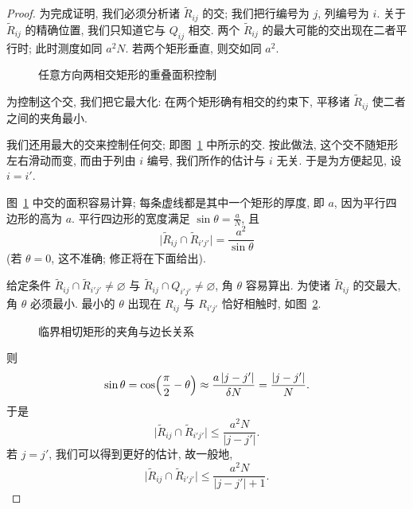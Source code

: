 \begin{proof}
为完成证明, 我们必须分析诸 $\tilde{R}_{ij}$ 的交; 我们把行编号为 $j$, 列编号为 $i$. 关于 $\tilde{R}_{ij}$ 的精确位置, 我们只知道它与 $Q_{ij}$ 相交. 两个 $\tilde{R}_{ij}$ 的最大可能的交出现在二者平行时; 此时测度如同 $a^2N$. 若两个矩形垂直, 则交如同 $a^2$.

\begin{figure}[htbp]
\centering
{}
\caption{任意方向两相交矩形的重叠面积控制}
\label{fig:15}
\end{figure}

为控制这个交, 我们把它最大化: 在两个矩形确有相交的约束下, 平移诸 $\tilde{R}_{ij}$ 使二者之间的夹角最小.

我们还用最大的交来控制任何交; 即图~\ref{fig:15} 中所示的交. 按此做法, 这个交不随矩形左右滑动而变, 而由于列由 $i$ 编号, 我们所作的估计与 $i$ 无关. 于是为方便起见, 设 $i=i'$.

图~\ref{fig:15} 中交的面积容易计算; 每条虚线都是其中一个矩形的厚度, 即 $a$, 因为平行四边形的高为 $a$. 平行四边形的宽度满足 $\sin\theta=\frac{a}{N}$, 且
\[
\bigl|\tilde{R}_{i j}\cap\tilde{R}_{i' j'}\bigr|=\frac{a^{2}}{\sin\theta}
\]
(若 $\theta=0$, 这不准确; 修正将在下面给出).

给定条件 $\tilde{R}_{ij}\cap\tilde{R}_{i'j'}\neq\varnothing$ 与 $\tilde{R}_{ij}\cap Q_{i'j'}\neq\varnothing$, 角 $\theta$ 容易算出. 为使诸 $\tilde{R}_{ij}$ 的交最大, 角 $\theta$ 必须最小. 最小的 $\theta$ 出现在 $R_{ij}$ 与 $R_{i'j'}$ 恰好相触时, 如图~\ref{fig:16}.

\begin{figure}[htbp]
\centering
{}
\caption{临界相切矩形的夹角与边长关系}
\label{fig:16}
\end{figure}

则
\[
\sin\theta=\cos\Bigl(\frac{\pi}{2}-\theta\Bigr)\approx\frac{a\,|j-j'|}{\delta N}=\frac{|j-j'|}{N}.
\]
于是
\[
\bigl|\tilde{R}_{i j}\cap\tilde{R}_{i' j'}\bigr|\leq\frac{a^{2}N}{|j-j'|}.
\]
若 $j=j'$, 我们可以得到更好的估计, 故一般地,
\[
\bigl|\tilde{R}_{i j}\cap\tilde{R}_{i' j'}\bigr|\leq\frac{a^{2}N}{|j-j'|+1}.
\]
\end{proof}

